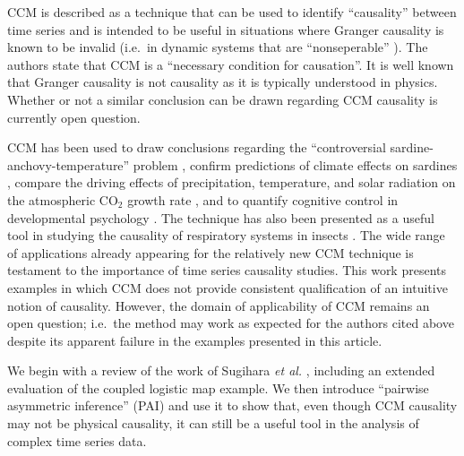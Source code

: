 \documentclass[twocolumn,aps,pre,groupedaddress]{revtex4-1}
\begin{document}
CCM is described as a technique that can be used to identify ``causality'' between time series and is intended to be useful in situations where Granger causality is known to be invalid (i.e.\ in dynamic systems that are ``nonseperable'' \cite{Sugihara2012}).  The authors state that CCM is a ``necessary condition for causation''.  It is well known \cite{Granger1980,liu2012,Roberts1985} that Granger causality is not causality as it is typically understood in physics.  Whether or not a similar conclusion can be drawn regarding CCM causality is currently open question. 

CCM has been used to draw conclusions regarding the ``controversial sardine-anchovy-temperature'' problem \cite{Sugihara2012}, confirm predictions of climate effects on sardines \cite{Deyle2013}, compare the driving effects of precipitation, temperature, and solar radiation on the atmospheric CO$_2$ growth rate \cite{Wang2014}, and to quantify cognitive control in developmental psychology \cite{Anastas2013}.  The technique has also been presented as a useful tool in studying the causality of respiratory systems in insects \cite{Bozorgmagham2013}.  The wide range of applications already appearing for the relatively new CCM technique is testament to the importance of time series causality studies.  This work presents examples in which CCM does not provide consistent qualification of an intuitive notion of causality.  However, the domain of applicability of CCM remains an open question; i.e.\ the method may work as expected for the authors cited above despite its apparent failure in the examples presented in this article. 

We begin with a review of the work of Sugihara {\em et al.} \cite{Sugihara2012}, including an extended evaluation of the coupled logistic map example.  We then introduce ``pairwise asymmetric inference'' (PAI) and use it to show that, even though CCM causality may not be physical causality, it can still be a useful tool in the analysis of complex time series data.
\end{document}
